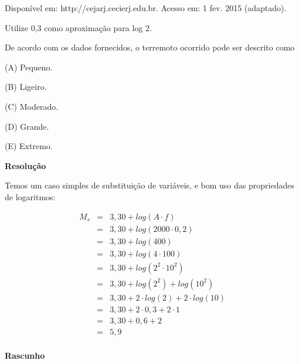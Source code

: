 {\scriptsize 
    \begin{flushright}
        Disponível em: http://cejarj.cecierj.edu.br. Acesso em: 1 fev. 2015 (adaptado). 
    \end{flushright}
}

Utilize 0,3 como aproximação para log 2. 

De acordo com os dados fornecidos, o terremoto ocorrido pode ser descrito como

(A) Pequeno.

(B) Ligeiro.

(C) Moderado.

(D) Grande.

(E) Extremo.



\textbf{Resolução}

Temos um caso simples de substituição de variáveis, e bom uso das propriedades de logaritmos:


\begin{eqnarray*}
    M_{s} 	&=& 3,30 + log(A \cdot f) \\
            &=& 3,30 + log(2000 \cdot 0,2) \\
            &=& 3,30 + log(400) \\
            &=& 3,30 + log(4 \cdot 100) \\
            &=& 3,30 + log(2^{2} \cdot 10^{2}) \\
            &=& 3,30 + log(2^{2}) + log(10^{2}) \\
            &=& 3,30 + 2 \cdot log(2) + 2 \cdot log(10) \\
            &=& 3,30 + 2 \cdot 0,3 + 2 \cdot 1 \\
            &=& 3,30 + 0,6 + 2 \\
            &=& 5,9 \\
\end{eqnarray*}


\textbf{Rascunho}

\quad
{}\quad
{}\quad

